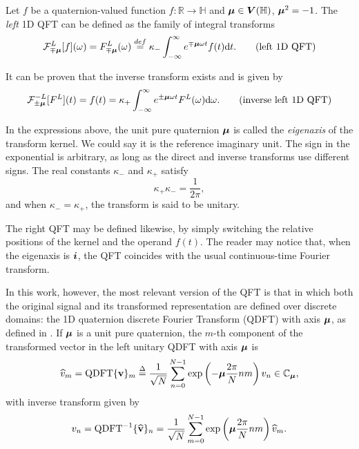 Let $f$ be a quaternion-valued function $f: \mathbb{R} \rightarrow \mathbb{H}$ and $\boldsymbol{\mu} \in \boldsymbol{V}(\mathbb{H})$, $\boldsymbol{\mu}^2 = -1$. The \textit{left} 1D QFT can be defined as the family of integral transforms
\begin{equation}
    \mathcal{F}^L_{\mp \boldsymbol{\mu}}[f](\omega) =
    F^L_{\mp \boldsymbol{\mu}}(\omega) \overset{def}{=}
    \kappa_{-} \int_{-\infty}^{\infty} e^{\mp \boldsymbol{\mu} \omega t} f(t) \mathrm{d}t.
    \tag{left 1D QFT}
\end{equation}

It can be proven that the inverse transform exists and is given by
\begin{equation}
    \mathcal{F}^{-L}_{\pm \boldsymbol{\mu}}[F^L](t) =
    f(t) =
    \kappa_{+} \int_{-\infty}^{\infty} e^{\pm \boldsymbol{\mu} \omega t} F^L(\omega) \mathrm{d}\omega.
    \tag{inverse left 1D QFT}
\end{equation}

In the expressions above, the unit pure quaternion $\boldsymbol{\mu}$ is called the \emph{eigenaxis} of the transform kernel. We could say it is the reference imaginary unit. The sign in the exponential is arbitrary, as long as the direct and inverse transforms use different signs. The real constants $\kappa_{-}$ and $\kappa_{+}$ satisfy
\begin{equation}
    \kappa_{+} \kappa_{-} = \frac{1}{2\pi},
\end{equation}
\noindent and when $\kappa_{-} = \kappa_{+}$, the transform is said to be unitary.

The right QFT may be defined likewise, by simply switching the relative positions of the kernel and the operand $f(t)$. The reader may notice that, when the eigenaxis is $\boldsymbol{i}$, the QFT coincides with the usual continuous-time Fourier transform.

In this work, however, the most relevant version of the QFT is that in which both the original signal and its transformed representation are defined over discrete domains: the 1D quaternion discrete Fourier Transform (QDFT) with axis $ \boldsymbol{\mu} $, as defined in \cite[sec. 3.3.1]{ell2014quaternion}. If $ \boldsymbol{\mu} $ is a unit pure quaternion, the $ m $-th component of the transformed vector in the left unitary QDFT with axis $ \boldsymbol{\mu} $ is
\begin{equation}
    \label{eq:QDFT_fwd}
    \widehat{v}_m = \text{QDFT}\{ \mathbf{v} \}_m \overset{\Delta}{=} \frac{1}{\sqrt{N}} \sum_{n=0}^{N-1}  \exp \left( -\boldsymbol{\mu} \frac{2\pi}{N} nm \right) v_n \in \mathbb{C}_{\boldsymbol{\mu}},
\end{equation}
with inverse transform given by
\begin{equation}
    \label{eq:QDFT_inv}
    v_n = \text{QDFT}^{-1}\{ \widehat{\mathbf{v}} \}_n = \frac{1}{\sqrt{N}}\sum_{m=0}^{N-1}  \exp \left( \boldsymbol{\mu} \frac{2\pi}{N} nm \right) \widehat{v}_m.
\end{equation}


